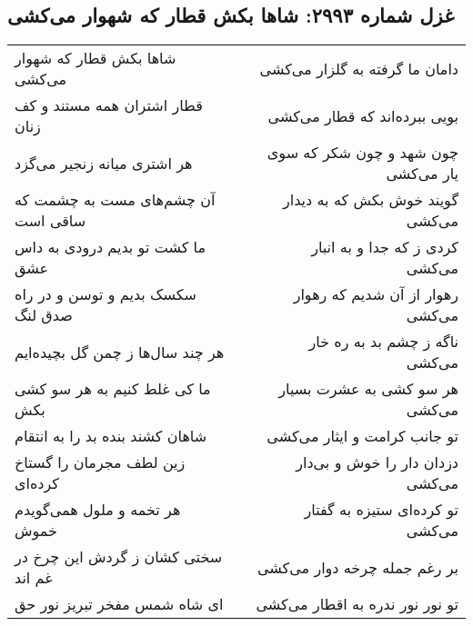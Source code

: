 \begin{center}
\section*{غزل شماره ۲۹۹۳: شاها بکش قطار که شهوار می‌کشی}
\label{sec:2993}
\begin{longtable}{l p{0.5cm} r}
شاها بکش قطار که شهوار می‌کشی
&&
دامان ما گرفته به گلزار می‌کشی
\\
قطار اشتران همه مستند و کف زنان
&&
بویی ببرده‌اند که قطار می‌کشی
\\
هر اشتری میانه زنجیر می‌گزد
&&
چون شهد و چون شکر که سوی یار می‌کشی
\\
آن چشم‌های مست به چشمت که ساقی است
&&
گویند خوش بکش که به دیدار می‌کشی
\\
ما کشت تو بدیم درودی به داس عشق
&&
کردی ز که جدا و به انبار می‌کشی
\\
سکسک بدیم و توسن و در راه صدق لنگ
&&
رهوار از آن شدیم که رهوار می‌کشی
\\
هر چند سال‌ها ز چمن گل بچیده‌ایم
&&
ناگه ز چشم بد به ره خار می‌کشی
\\
ما کی غلط کنیم به هر سو کشی بکش
&&
هر سو کشی به عشرت بسیار می‌کشی
\\
شاهان کشند بنده بد را به انتقام
&&
تو جانب کرامت و ایثار می‌کشی
\\
زین لطف مجرمان را گستاخ کرده‌ای
&&
دزدان دار را خوش و بی‌دار می‌کشی
\\
هر تخمه و ملول همی‌گویدم خموش
&&
تو کرده‌ای ستیزه به گفتار می‌کشی
\\
سختی کشان ز گردش این چرخ در غم اند
&&
بر رغم جمله چرخه دوار می‌کشی
\\
ای شاه شمس مفخر تبریز نور حق
&&
تو نور نور ندره به اقطار می‌کشی
\\
\end{longtable}
\end{center}
